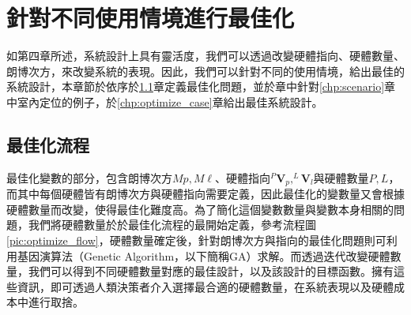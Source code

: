 \chapter{針對不同使用情境進行最佳化}
\label{chp:5}



如第四章所述，系統設計上具有靈活度，我們可以透過改變硬體指向、硬體數量、朗博次方，來改變系統的表現。因此，我們可以針對不同的使用情境，給出最佳的系統設計，本章節於依序於\ref{chp:optimize}章定義最佳化問題，並於章中針對\ref{chp:scenario}章中室內定位的例子，於\ref{chp:optimize_case}章給出最佳系統設計。








\section{最佳化流程}
\label{chp:optimize}

最佳化變數的部分，包含朗博次方$Mp,M\ell$、硬體指向$^{P}\boldsymbol{V}_p,^{L}\boldsymbol{V}_l$與硬體數量$P,L$，而其中每個硬體皆有朗博次方與硬體指向需要定義，因此最佳化的變數量又會根據硬體數量而改變，使得最佳化難度高。為了簡化這個變數數量與變數本身相關的問題，我們將硬體數量於於最佳化流程的最開始定義，參考流程圖\ref{pic:optimize_flow}，硬體數量確定後，針對朗博次方與指向的最佳化問題則可利用基因演算法（Genetic Algorithm，以下簡稱GA）求解。而透過迭代改變硬體數量，我們可以得到不同硬體數量對應的最佳設計，以及該設計的目標函數。擁有這些資訊，即可透過人類決策者介入選擇最合適的硬體數量，在系統表現以及硬體成本中進行取捨。


